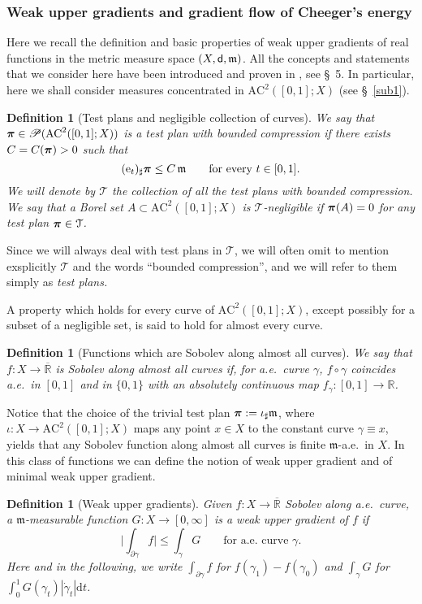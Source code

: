 \documentclass[reqno,11pt]{article}
\numberwithin{equation}{section}
\newcommand{\R}{\mathbb{R}}
\newcommand{\mm}{{\mbox{\boldmath$m$}}}
\newcommand{\ppi}{{\mbox{\boldmath$\pi$}}}
\newcommand{\sfd}{{\sf d}}
\renewcommand{\d}{{\mathrm d}}
\newcommand{\Probabilities}[1]{\mathscr P(#1)}          %
\newtheorem{definition}[theorem]{Definition}
\newcommand{\prob}{\Probabilities}
\newcommand{\e}{{\rm{e}}}                           %
\newcommand{\AC}[3]{\mathrm{AC}^{#1}(#2;#3)}
\newcommand{\calT}{{\mathcal T}}
\renewcommand{\mm}{\mathfrak m}
\begin{document}
\subsubsection{Weak upper gradients and gradient flow of Cheeger's energy}

Here we recall the definition and basic properties of weak upper
gradients of real functions in the metric measure space
$(X,\sfd,\mm)$. All the concepts and statements that we consider
here have been introduced and proven in
\cite{Ambrosio-Gigli-Savare11}, see \S~5. In particular, here  we
shall consider measures concentrated in $\AC2{[0,1]}X$ (see
\S~\ref{sub1}).

\begin{definition}[Test plans and negligible collection of
  curves]
\label{def:testplan}
We say that\\
 $\ppi\in \prob{\AC2{[0,1]}X}$ is a test plan
 with bounded compression if there exists $C=C(\ppi)>0$ such
that
\[
(\e_t)_\sharp\ppi\leq C\,\mm\qquad\text{for every } t\in[0,1].
\]
We will denote by $\calT$ the collection of all the test plans with
bounded compression. We say that a Borel set $A\subset \AC2{[0,1]}X
$ is $\calT$-\emph{negligible} if $\ppi(A)=0$ for any test plan
$\ppi\in\calT$.
\end{definition}
Since we will always deal with test plans in $\calT$, we will often
omit to mention exsplicitly $\calT$ and the words ``bounded
compression'', and we will refer to them simply as \emph{test
plans.}

A property which holds for every curve of $\AC2{[0,1]}X $, except
possibly for a subset of a negligible set, is said to hold for
almost every curve.

\begin{definition}[Functions which are Sobolev along almost all curves]
We say that $f:X\to\overline{\R}$ is Sobolev along almost all curves
if, for a.e.~curve $\gamma$, $f\circ\gamma$ coincides a.e.~in
$[0,1]$ and in $\{0,1\}$ with an absolutely continuous map
$f_\gamma:[0,1]\to\R$.
\end{definition}

Notice that the choice of the trivial test plan $\ppi:=\iota_\sharp
\mm$, where $\iota:X\to \AC 2{[0,1]}X$ maps any point $x\in X$ to
the constant curve $\gamma\equiv x$, yields that any Sobolev
function along almost all curves is finite $\mm$-a.e.~in $X$. In
this class of functions we can define the notion of weak upper
gradient and of minimal weak upper gradient.

\begin{definition}[Weak upper gradients]\label{def:weak_upper_gradient}
Given $f:X\to\overline{\R}$ Sobolev along a.e.~curve, a
$\mm$-measurable function $G:X\to[0,\infty]$ is a weak upper
gradient of $f$ if
\begin{equation}
\label{eq:inweak} \biggl|\int_{\partial\gamma}f\biggr|\leq
\int_\gamma G\qquad\text{for a.e.~curve }\gamma.
\end{equation}
Here and in the following, we write $\int_{\partial\gamma}f$ for
$f(\gamma_1)-f(\gamma_0)$ and $\int_\gamma G$ for $\int_0^1
G(\gamma_t)|\dot\gamma_t|\d t$.
\end{definition}
\end{document}
